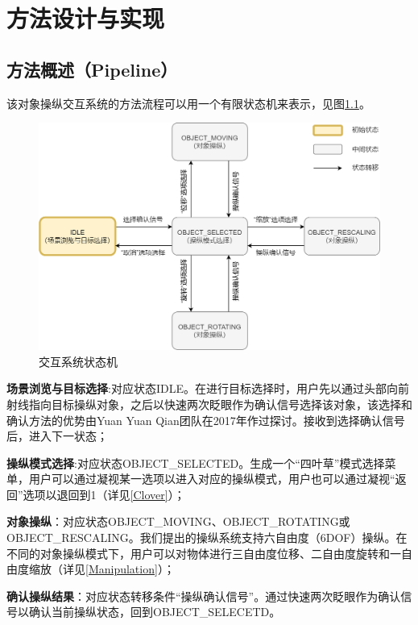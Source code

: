 \newcommand{\us}{\_}

\chapter{方法设计与实现}

\section{方法概述（Pipeline）}

该对象操纵交互系统的方法流程可以用一个有限状态机来表示，见图\ref{fig-3-1}。

\begin{figure}[b!]
    \centering
    \includegraphics[width=.85\textwidth]{figure/system_state_machine.png}
    \caption{交互系统状态机}
    \label{fig-3-1}
\end{figure}

{\bf 场景浏览与目标选择}:对应状态IDLE。在进行目标选择时，用户先以通过头部向前射线指向目标操纵对象，之后以快速两次眨眼作为确认信号选择该对象，该选择和确认方法的优势由Yuan Yuan Qian团队在2017年作过探讨。接收到选择确认信号后，进入下一状态；

{\bf 操纵模式选择}:对应状态OBJECT\us SELECTED。生成一个“四叶草”模式选择菜单，用户可以通过凝视某一选项以进入对应的操纵模式，用户也可以通过凝视“返回”选项以退回到1（详见\autoref{Clover}）；

{\bf 对象操纵}：对应状态OBJECT\us MOVING、OBJECT\us ROTATING或OBJECT\us RESCALING。我们提出的操纵系统支持六自由度（6DOF）操纵。在不同的对象操纵模式下，用户可以对物体进行三自由度位移、二自由度旋转和一自由度缩放（详见\autoref{Manipulation}）；

{\bf 确认操纵结果}：对应状态转移条件“操纵确认信号”。通过快速两次眨眼作为确认信号以确认当前操纵状态，回到OBJECT\us SELECETD。

